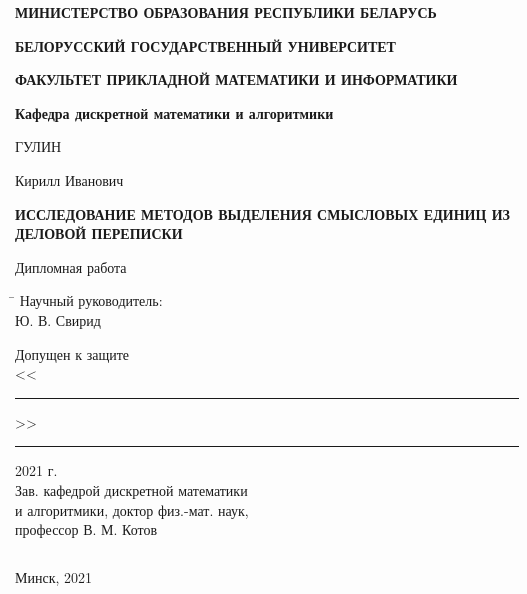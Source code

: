 \begin{titlepage}
\begin{center}

$ $

$ $

$ $

$ $

$ $

$ $

$ $

$ $

$ $

$ $

$ $

$ $

$ $

\textbf{МИНИСТЕРСТВО ОБРАЗОВАНИЯ РЕСПУБЛИКИ БЕЛАРУСЬ}
\vspace{1.5 ex}

\textbf{БЕЛОРУССКИЙ ГОСУДАРСТВЕННЫЙ УНИВЕРСИТЕТ}
\vspace{1.5 ex}

\textbf{ФАКУЛЬТЕТ ПРИКЛАДНОЙ МАТЕМАТИКИ И ИНФОРМАТИКИ}
\vspace{1.5 ex}

\textbf{Кафедра дискретной математики и алгоритмики}
\vspace{7 ex}

\noindent
ГУЛИН

\large
Кирилл Иванович
\vspace{5 ex}

\textbf{ИССЛЕДОВАНИЕ МЕТОДОВ ВЫДЕЛЕНИЯ СМЫСЛОВЫХ ЕДИНИЦ ИЗ ДЕЛОВОЙ ПЕРЕПИСКИ}

\vspace{7 ex}
\large
Дипломная работа
\vspace{5 ex}

\begin{tabbing}
\hspace*{115mm}\=\hspace*{7cm}\kill 
 \> Научный руководитель: \\
 \>  Ю. В. Свирид \\ \vspace{5 ex}

Допущен к защите \\
<<\rule {30pt} {0.5 pt}>>\rule {100pt} {0.5 pt} 2021 г. \> \\
Зав. кафедрой дискретной математики \> \\
и алгоритмики, доктор физ.-мат. наук,\> \\
профессор В. М. Котов
\end{tabbing}

\vfill

$ $

Минск, 2021

\end{center}

\end{titlepage}